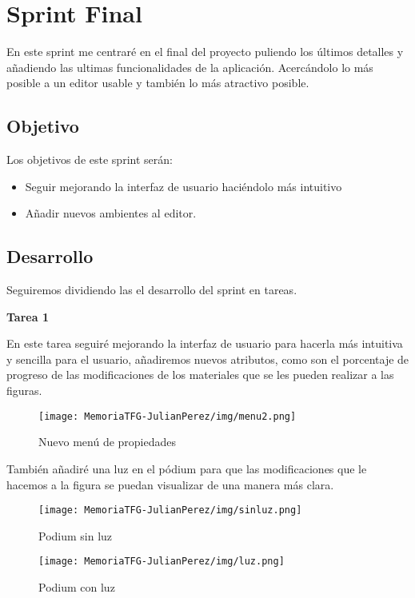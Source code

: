\documentclass[a4paper, 12pt]{book}
\begin{document}
\section{Sprint Final}
En este sprint me centraré en el final del proyecto puliendo los últimos detalles y añadiendo las ultimas funcionalidades de la aplicación. Acercándolo lo más posible a un editor usable y también lo más atractivo posible.

\subsection{Objetivo}
Los objetivos de este sprint serán:
\begin{itemize}
    \item Seguir mejorando la interfaz de usuario haciéndolo más intuitivo
    \item Añadir nuevos ambientes al editor.
\end{itemize}

\subsection{Desarrollo}
Seguiremos dividiendo las el desarrollo del sprint en tareas.

\textbf{Tarea 1}

En este tarea seguiré mejorando la interfaz de usuario para hacerla más intuitiva y sencilla para el usuario, añadiremos nuevos atributos, como son el porcentaje de progreso de las modificaciones de los materiales que se les pueden realizar a las figuras.

\begin{figure}[H]
  \centering
  \texttt{[image: MemoriaTFG-JulianPerez/img/menu2.png]}
  \caption{Nuevo menú de propiedades}\label{menu2}
\end{figure}

También añadiré una luz en el pódium para que las modificaciones que le hacemos a la figura se puedan visualizar de una manera más clara.

\begin{figure}[H]
  \centering
  \begin{minipage}[b]{0.4\textwidth}
 \texttt{[image: MemoriaTFG-JulianPerez/img/sinluz.png]}
  \caption{Podium sin luz}\label{single}
  \end{minipage}
  \hfill
  \begin{minipage}[b]{0.4\textwidth}
  \texttt{[image: MemoriaTFG-JulianPerez/img/luz.png]}
  \caption{Podium con luz}\label{scrum}
  \end{minipage}
\end{figure}
\end{document}

